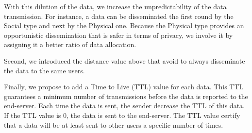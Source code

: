 With this dilution of the data, we increase the unpredictability of the data transmission.
For instance, a data can be disseminated the first round by the Social type and next by the Physical one.
Because the Physical type provides an opportunistic dissemination that is safer in terms of privacy, we involve it by assigning it a better ratio of data allocation.

Second, we introduced the distance value above that avoid to always disseminate the data to the same users.

Finally, we propose to add a Time to Live (TTL) value for each data.
This TTL guarantees a minimum number of transmissions before the data is reported to the end-server.
Each time the data is sent, the sender decrease the TTL of this data.
If the TTL value is 0, the data is sent to the end-server.
The TTL value certify that a data will be at least sent to other users a specific number of times.

